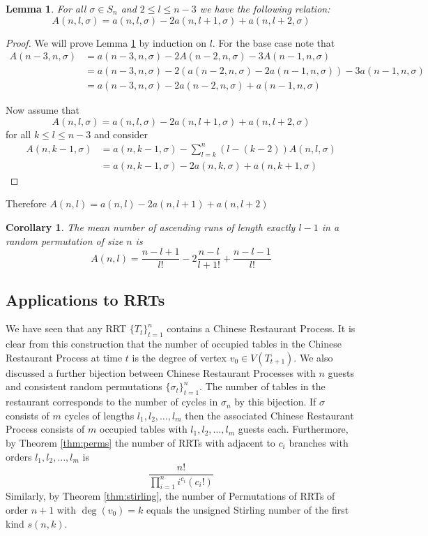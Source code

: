 \documentclass[oneside]{book} %
\newtheorem{lem}[thm]{Lemma}
\newtheorem{cor}[thm]{Corollary}
\theoremstyle{definition}
\numberwithin{equation}{section}
\begin{document}
\begin{lem}\label{lem:induction}
 For all $\sigma \in S_n$ and $ 2 \leq l \leq n-3 $ we have the following relation:
 \[
  A(n,l,\sigma) = a(n,l,\sigma) -2 a(n,l+1,\sigma) + a(n,l+2,\sigma)  
 \]
\end{lem}
\begin{proof}
 We will prove Lemma \ref{lem:induction} by induction on $l$.  For the base case note that 
\begin{align}
  A(n-3,n,\sigma) &= a(n-3,n,\sigma) -  2A(n-2,n,\sigma) - 3A(n-1,n,\sigma) \\
  &= a(n-3,n,\sigma) -  2(a(n-2,n,\sigma) - 2a(n-1,n,\sigma)) -  3a(n-1,n,\sigma) \\
  &= a(n-3,n,\sigma) -  2a(n-2,n,\sigma) + a(n-1,n,\sigma) 
\end{align}

Now assume that 
 \[
  A(n,l,\sigma) = a(n,l,\sigma) -2 a(n,l+1,\sigma) + a(n,l+2,\sigma)  
 \]
for all $k \leq l \leq n-3$ and consider 
\begin{align}
 A(n,k-1,\sigma) &= a(n,k-1,\sigma) - \sum_{l = k}^n(l-(k-2))A(n,l,\sigma)  \\
 &= a(n,k-1,\sigma) - 2a(n,k,\sigma) + a(n,k+1,\sigma)
\end{align}
\end{proof}

Therefore $A(n,l) = a(n,l) - 2a(n,l+1) + a(n,l+2)$

\begin{cor}
The mean number of ascending runs of length \emph{exactly} $l-1$ in a random permutation of size $n$ is
\[A(n,l) = \frac{n-l+1}{l!} - 2\frac{n-l}{l+1!} + \frac{n-l-1}{l!}\] 
\end{cor}



\subsection{Applications to RRTs}\label{sec:Applications}
We have seen that any RRT $\{T_t\}_{t=1}^{n}$ contains a Chinese Restaurant Process.  It is clear from this construction that
the number of occupied tables in the Chinese Restaurant Process at time $t$ is the degree of vertex $v_0 \in V(T_{t+1})$.  We 
also discussed a further bijection between Chinese Restaurant Processes with $n$ guests and consistent random permutations 
$\{\sigma_t\}_{t=1}^{n}$. The number of tables in the restaurant corresponds to the number of cycles in $\sigma_n$ by this
bijection. If $\sigma$ consists of $m$ cycles of lengths $l_1,l_2,\dots,l_m$ then the associated Chinese Restaurant Process
consists of $m$ occupied tables with $l_1,l_2,\dots,l_m$ guests each. Furthermore, by Theorem \ref{thm:perms} the number of RRTs with adjacent to $c_i$ branches with orders $l_1,l_2,\dots,l_m$ is  
 \[
   \frac{n!}{\prod_{i=1}^{n}i^{c_{i}}(c_i!)}
 \]  
Similarly, by Theorem \ref{thm:stirling}, the number of Permutations of RRTs of order $n+1$ with $\deg(v_0) = k $ equals the unsigned Stirling number of the first kind $s(n,k)$.
\end{document}
